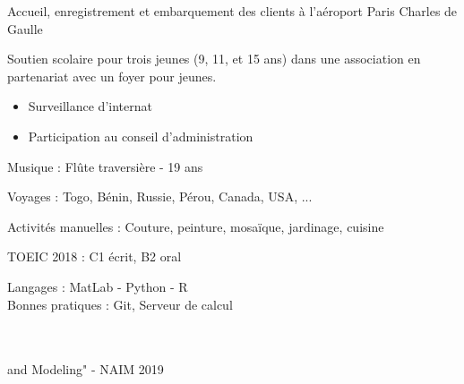 




   Accueil, enregistrement et embarquement des clients à l'aéroport Paris Charles de Gaulle

\divider

Soutien scolaire pour trois jeunes (9, 11, et 15 ans) dans une association en
partenariat avec un foyer pour jeunes.

\divider

\begin{itemize}
\item Surveillance d'internat
\item Participation au conseil d'administration
\end{itemize}



{\large\color{emphasis} \faMusic \vspace{0.2cm}  Musique : } 
    Flûte traversière - 19 ans\\
  \vspace{0.5cm}

{\large\color{emphasis} \faGlobe \vspace{0.2cm} Voyages : }  
    Togo, Bénin, Russie, Pérou, Canada, USA, ...\\
  \vspace{0.5cm}
  
{\large\color{emphasis} \faCut  \vspace{0.2cm} Activités manuelles : }
    Couture, peinture, mosaïque, jardinage, cuisine


TOEIC 2018 : C1 écrit, B2 oral



Langages : MatLab - Python  - R\\
Bonnes pratiques : Git, Serveur de calcul

\vspace{0.5cm}

\vspace{0.5cm}

 \\
 \\ \hspace{0.5cm} and Modeling" - NAIM 2019
    
